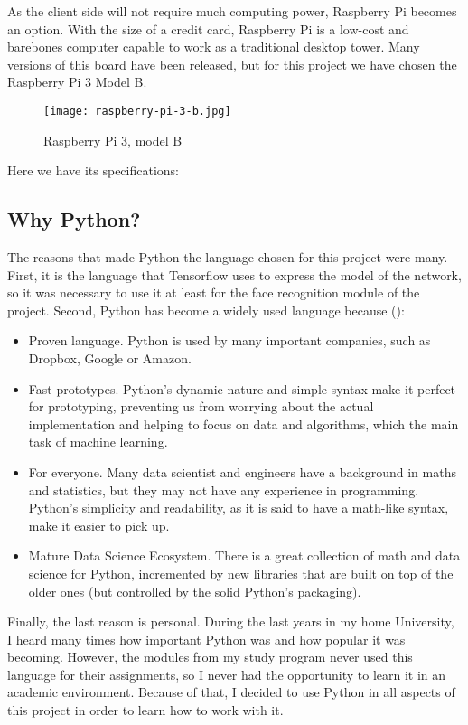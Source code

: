 	As the client side will not require much computing power, Raspberry Pi becomes an option. With the size of a credit card, Raspberry Pi is a low-cost and barebones computer capable to work as a traditional desktop tower. Many versions of this board have been released, but for this project we have chosen the Raspberry Pi 3 Model B.

	\begin{figure}[ht]
		\centering
		\texttt{[image: raspberry-pi-3-b.jpg]}
		\caption{Raspberry Pi 3, model B}
	\end{figure}

	Here we have its specifications:

	\subsection{Why Python?}
	The reasons that made Python the language chosen for this project were many. First, it is the language that Tensorflow uses to express the model of the network, so it was necessary to use it at least for the face recognition module of the project. Second, Python has become a widely used language because (\cite{why_python}):

	\begin{itemize}
		\item Proven language. Python is used by many important companies, such as Dropbox, Google or Amazon. 
		\item Fast prototypes. Python's dynamic nature and simple syntax make it perfect for prototyping, preventing us from worrying about the actual implementation and helping to focus on data and algorithms, which the main task of machine learning.
		\item For everyone. Many data scientist and engineers have a background in maths and statistics, but they may not have any experience in programming. Python's simplicity and readability, as it is said to have a math-like syntax, make it easier to pick up.
		\item Mature Data Science Ecosystem. There is a great collection of math and data science for Python, incremented by new libraries that are built on top of the older ones (but controlled by the solid Python's packaging). 
	\end{itemize}

	Finally, the last reason is personal. During the last years in my home University, I heard many times how important Python was and how popular it was becoming. However, the modules from my study program never used this language for their assignments, so I never had the opportunity to learn it in an academic environment. Because of that, I decided to use Python in all aspects of this project in order to learn how to work with it.  

